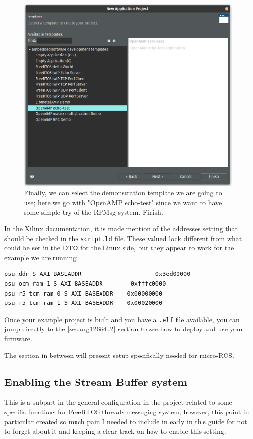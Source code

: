 \documentclass[10pt]{article}
\begin{document}
\begin{figure}[htbp]
\centering
\includegraphics[width=.6\textwidth]{./img/vitis_new/project7.png}
\caption{\label{fig:orgfc203fd}Finally, we can select the demonstration template we are going to use; here we go with "OpenAMP echo-test" since we want to have some simple try of the RPMsg system. Finish.}
\end{figure}

\pagebreak
In the Xilinx documentation, it is made mention of the addresses setting that should be checked in the \texttt{script.ld} file.
These valued look different from what could be set in the DTO for the Linux side, but they appear to
work for the example we are running:

\begin{verbatim}
psu_ddr_S_AXI_BASEADDR                     0x3ed00000	
psu_ocm_ram_1_S_AXI_BASEADDR        0xfffc0000
psu_r5_tcm_ram_0_S_AXI_BASEADDR    0x00000000
psu_r5_tcm_ram_1_S_AXI_BASEADDR    0x00020000	
\end{verbatim}

Once your example project is built and you have a \texttt{.elf} file available, you can
jump directly to the \ref{sec:org12684a2} section to see how to deploy and use your firmware.

The section in between will present setup specifically needed for micro-ROS.

\subsection{Enabling the Stream Buffer system}
\label{sec:org971efc7}
This is a subpart in the general configuration in the project related to some specific
functions for FreeRTOS threads messaging system, however, this point in particular
created so much pain I needed to include in early in this guide for not to forget about it
and keeping a clear track on how to enable this setting.
\end{document}
